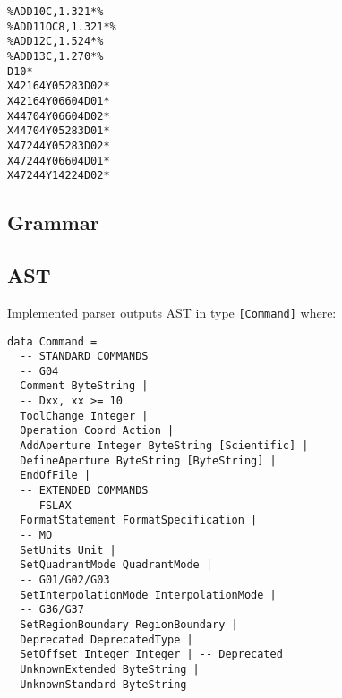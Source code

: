 \documentclass[12pt,a4paper]{article}
\begin{document}
\lstset{language=bash}
\lstset{frame=lines}
\lstset{basicstyle=\scriptsize\ttfamily}
\begin{lstlisting}
%ADD10C,1.321*%
%ADD11OC8,1.321*%
%ADD12C,1.524*%
%ADD13C,1.270*%
D10*
X42164Y05283D02*
X42164Y06604D01*
X44704Y06604D02*
X44704Y05283D01*
X47244Y05283D02*
X47244Y06604D01*
X47244Y14224D02*
\end{lstlisting}

\subsection{Grammar}
\lstset{basicstyle=\scriptsize\ttfamily}


\subsection{AST}
Implemented parser outputs AST in type \texttt{[Command]} where:

\lstset{language=haskell}
\lstset{frame=lines}
\lstset{basicstyle=\footnotesize\ttfamily}
\begin{lstlisting}
data Command =
  -- STANDARD COMMANDS
  -- G04
  Comment ByteString |
  -- Dxx, xx >= 10
  ToolChange Integer |
  Operation Coord Action |
  AddAperture Integer ByteString [Scientific] |
  DefineAperture ByteString [ByteString] |
  EndOfFile |
  -- EXTENDED COMMANDS
  -- FSLAX
  FormatStatement FormatSpecification |
  -- MO
  SetUnits Unit |
  SetQuadrantMode QuadrantMode |
  -- G01/G02/G03
  SetInterpolationMode InterpolationMode |
  -- G36/G37
  SetRegionBoundary RegionBoundary |
  Deprecated DeprecatedType |
  SetOffset Integer Integer | -- Deprecated
  UnknownExtended ByteString |
  UnknownStandard ByteString
\end{lstlisting}
\end{document}
